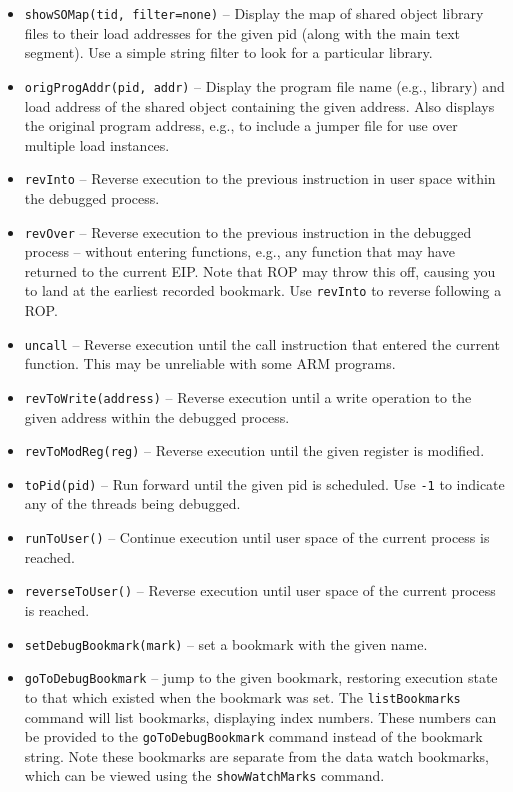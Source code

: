 \documentclass[titlepage]{article}
\begin{document}
\begin{itemize}
\item {\tt showSOMap(tid, filter=none)} – Display the map of shared object library files to their load addresses for the given pid (along with the main text segment).
Use a simple string filter to look for a particular library.

\item {\tt origProgAddr(pid, addr)} – Display the program file name (e.g., library) and load address of the shared object containing the given address.  Also displays the 
original program address, e.g., to include a jumper file for use over multiple load instances.

\item {\tt revInto} – Reverse execution to the previous instruction in user space within the debugged process. 

\item {\tt revOver} – Reverse execution to the previous instruction in the debugged process – without entering functions, e.g., any function that may have returned to the current EIP.  Note that ROP may throw this off, causing you to land at the earliest recorded bookmark.  Use {\tt revInto} to reverse following a ROP.

\item {\tt uncall} – Reverse execution until the call instruction that entered the current function.  This may be unreliable with some ARM
programs.

\item {\tt revToWrite(address)} – Reverse execution until a write operation to the given address within the debugged process.

\item {\tt revToModReg(reg)} – Reverse execution until the given register is modified.


\item {\tt toPid(pid)} -- Run forward until the given pid is scheduled.  Use {\tt -1} to indicate any of the threads being debugged.

\item {\tt runToUser()} – Continue execution until user space of the current process is reached.

\item {\tt reverseToUser()} – Reverse execution until user space of the current process is reached.

\item {\tt setDebugBookmark(mark)} – set a bookmark with the given name.

\item {\tt goToDebugBookmark} – jump to the given bookmark, restoring execution state to that which existed when the bookmark was set.  The
{\tt listBookmarks} command will list bookmarks, displaying  index numbers.  These numbers can be provided to the {\tt goToDebugBookmark} command instead
of the bookmark string.  Note these bookmarks are separate from the data watch bookmarks, which can be viewed using the {\tt showWatchMarks} command.


\end{itemize}
\end{document}
